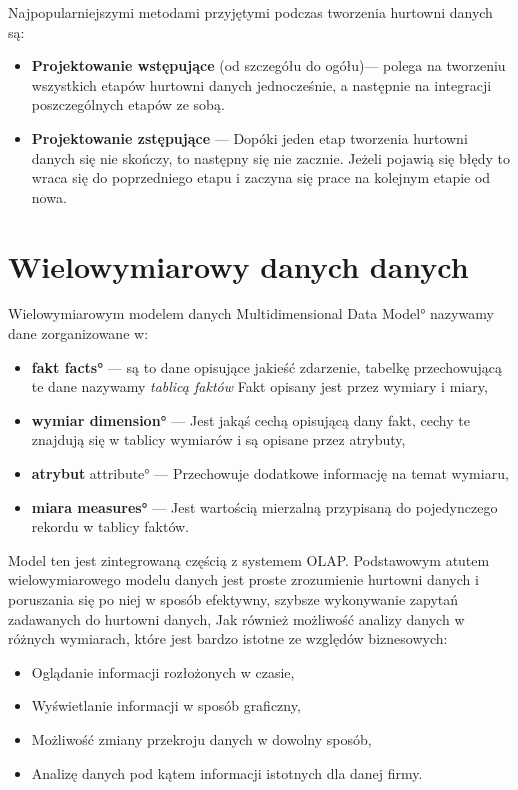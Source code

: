 Najpopularniejszymi metodami przyjętymi podczas tworzenia hurtowni danych są:
\begin{itemize}
 \item \textbf{Projektowanie wstępujące} (od szczegółu do ogółu)---
    polega na tworzeniu wszystkich etapów hurtowni danych 
     jednocześnie, a następnie na integracji poszczególnych etapów ze sobą.
 \item \textbf{Projektowanie zstępujące} ---
    Dopóki jeden etap tworzenia hurtowni danych się nie skończy, 
     to następny się nie zacznie. Jeżeli pojawią się błędy to wraca się do poprzedniego etapu i zaczyna się prace 
     na kolejnym etapie od nowa.
\end{itemize}



\section{Wielowymiarowy danych danych}
Wielowymiarowym modelem danych \ang{Multidimensional Data Model} 
nazywamy dane zorganizowane w:
\begin{itemize}
 \item 
    \textbf{fakt \ang{facts}  } ---   są to dane opisujące jakieść zdarzenie, 
    tabelkę przechowującą te dane nazywamy  \textit{tablicą faktów} 
    Fakt opisany jest przez wymiary i miary,
 \item \textbf{wymiar \ang{dimension}} --- 
    Jest jakąś cechą opisującą dany fakt, cechy te znajdują się w tablicy wymiarów i są opisane przez atrybuty,
 \item \textbf{atrybut} \ang{ attribute}  --- 
    Przechowuje dodatkowe informację na temat wymiaru,
 \item \textbf{miara \ang{measures}} --- 
    Jest wartością mierzalną przypisaną do pojedynczego rekordu w tablicy faktów. 
\end{itemize}

Model ten jest zintegrowaną częścią z systemem OLAP.
Podstawowym atutem wielowymiarowego modelu danych jest proste zrozumienie hurtowni danych 
 i poruszania się po niej w sposób efektywny, szybsze wykonywanie zapytań zadawanych do hurtowni danych, 
 Jak również możliwość analizy danych w różnych wymiarach, 
które jest bardzo istotne ze względów biznesowych:
\begin{itemize}
 \item Oglądanie informacji rozłożonych w czasie,
 \item Wyświetlanie informacji w sposób graficzny,
 \item Możliwość zmiany przekroju danych w dowolny sposób,
 \item Analizę danych pod kątem informacji istotnych dla danej firmy.
\end{itemize}

